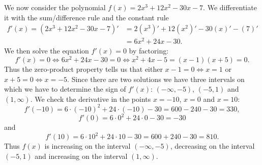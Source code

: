 \documentclass[main.tex]{subfiles}
\begin{document}
\begin{example}[label=ex:thirdPoly]
We now consider the polynomial $f(x) = 2 x^3 + 12 x^2 - 30 x - 7$. We differentiate it with the sum/difference rule and the constant rule
\begin{align}
f'(x) = \left( 2 x^3 + 12 x^2 - 30 x - 7 \right)' &= 2 \left( x^3 \right) ' + 12 \left( x^2 \right)' - 30 \left( x \right)' - \left( 7 \right)' \\
&= 6 x^2 + 24 x - 30.
\end{align}
We then solve the equation $f'(x) = 0$ by factoring:
\begin{equation}
f'(x) = 0 \Leftrightarrow 6 x^2 + 24 x - 30 = 0 \Leftrightarrow x^2 + 4 x - 5 = (x - 1) (x + 5) = 0.
\end{equation}
Thus the zero-product property tells us that either $x - 1 = 0 \Leftrightarrow x = 1$ or $x + 5 = 0 \Leftrightarrow x = - 5$. Since there are two solutions we have three intervals on which we have to determine the sign of $f'(x)$: $(-\infty, -5)$, $(-5, 1)$ and $(1, \infty)$. We check the derivative in the points $x = -10$, $x = 0$ and $x = 10$:
\begin{equation}
f'(-10) = 6 \cdot (-10)^2 + 24 \cdot (-10) - 30 = 600 - 240 - 30 = 330,
\end{equation}
\begin{equation}
f'(0) = 6 \cdot 0^2 + 24 \cdot 0 - 30 = -30
\end{equation}
and
\begin{equation}
f'(10) = 6 \cdot 10^2 + 24 \cdot 10 - 30 = 600 + 240 - 30 = 810.
\end{equation}
Thus $f(x)$ is increasing on the interval $(-\infty, -5)$, decreasing on the interval $(-5, 1)$ and increasing on the interval $(1, \infty)$.
\end{example}
\end{document}
